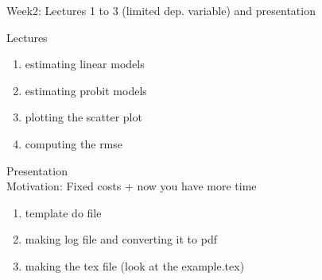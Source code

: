 \documentclass{beamer}
\begin{document}
\begin{frame}{Week2: Lectures 1 to 3 (limited dep. variable) and presentation}

Lectures
\begin{enumerate}[1.]
\item estimating linear models
\item estimating probit models
\item plotting the scatter plot
\item computing the rmse
\end{enumerate}

Presentation
\\
Motivation: Fixed costs + now you have more time
\\
\begin{enumerate}[1.]
\item template do file
\item making log file and converting it to pdf
\item making the tex file (look at the example.tex)
\end{enumerate}
    
\end{frame}


\end{document}
